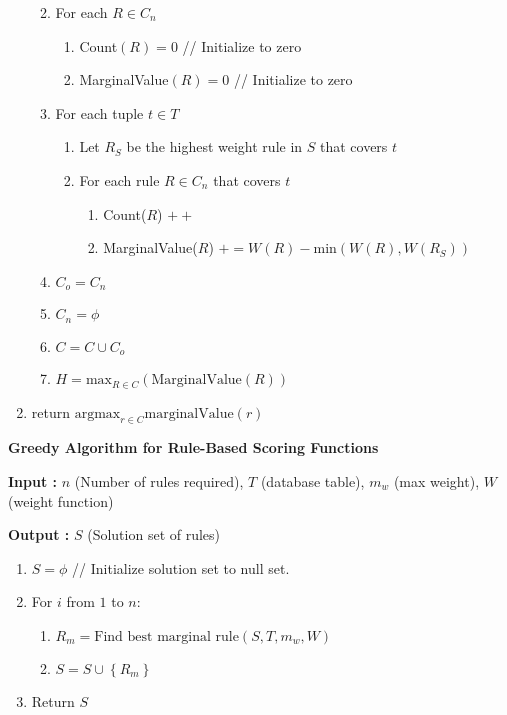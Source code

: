 \documentclass{sig-alternate}
\begin{document}
\begin{framed}
\begin{enumerate}
\begin{enumerate}[label*=\arabic*.]
\begin{enumerate}[label*=\arabic*.]
\end{enumerate}
\item For each $R \in C_n$
\begin{enumerate}[label*=\arabic*.]
\item Count$(R) = 0$ // Initialize to zero
\item MarginalValue$(R) = 0$ // Initialize to zero
\end{enumerate}
\item For each tuple $t \in T$
\begin{enumerate}[label*=\arabic*.]
\item Let $R_S$ be the highest weight rule in $S$ that covers $t$
\item For each rule $R \in C_n$ that covers $t$
\begin{enumerate}[label*=\arabic*.]
\item Count($R$) $++$
\item MarginalValue($R$) $+= W(R) - \text{min}(W(R), W(R_S))$
\end{enumerate}
\end{enumerate}
\item $C_o = C_n$
\item $C_n = \phi$
\item $C = C \cup C_o$
\item $H = \text{max}_{R \in C}(\text{MarginalValue}(R))$
\end{enumerate}
\item return $\text{argmax}_{r \in C} \text{marginalValue}(r)$
\end{enumerate}
\end{framed}

\begin{framed}
\textbf{Greedy Algorithm for Rule-Based Scoring Functions}

\textbf{Input :} $n$ (Number of rules required), $T$ (database table), $m_w$ (max weight), $W$ (weight function)

\textbf{Output :} $S$ (Solution set of rules)
\begin{enumerate}
\item $S = \phi$ // Initialize solution set to null set.
\item For $i$ from $1$ to $n$:
\begin{enumerate}[label*=\arabic*.]
\item $R_m = \text{Find best marginal rule}(S, T, m_w, W)$
\item $S = S \cup \left\lbrace R_m \right\rbrace$
\end{enumerate}
\item Return $S$
\end{enumerate}

\end{framed}
\end{document}

